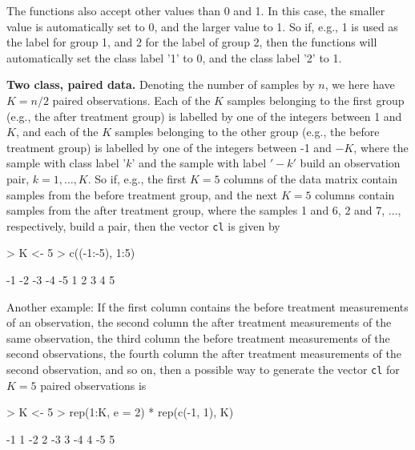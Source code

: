 \documentclass[a4paper]{article}
\begin{document}
The functions also accept other values than 0 and 1. In this case,
the smaller value is automatically set to 0, and the larger value
to 1. So if, e.g., 1 is used as the label for group 1, and 2 for
the label of group 2, then the functions will automatically set the
class label '1' to 0, and the class label '2' to 1.


\vspace*{18pt} \noindent \textbf{Two class, paired data.} Denoting
the number of samples by $n$, we here have $K=n/2$ paired
observations. Each of the $K$ samples belonging to the first group
(e.g., the after treatment group) is labelled by one of the
integers between 1 and $K$, and each of the $K$ samples belonging
to the other group (e.g., the before treatment group) is labelled
by one of the integers between -1 and $-K$, where the sample with
class label '$k$' and the sample with label $'-k'$ build an
observation pair, $k=1,\ldots,K$. So if, e.g., the first $K=5$
columns of the data matrix contain samples from the before
treatment group, and the next $K=5$ columns contain samples from
the after treatment group, where the samples 1 and 6, 2 and 7,
..., respectively, build a pair, then the vector \texttt{cl} is
given by

\begin{Schunk}
\begin{Sinput}
> K <- 5
> c((-1:-5), 1:5)
\end{Sinput}
\begin{Soutput}
 [1] -1 -2 -3 -4 -5  1  2  3  4  5
\end{Soutput}
\end{Schunk}


Another example: If the first column contains the before treatment
measurements of an observation, the second column the after
treatment measurements of the same observation, the third column
the before treatment measurements of the second observations, the
fourth column the after treatment measurements of the second
observation, and so on, then a possible way to generate the vector
\texttt{cl} for $K=5$ paired observations is

\begin{Schunk}
\begin{Sinput}
> K <- 5
> rep(1:K, e = 2) * rep(c(-1, 1), K)
\end{Sinput}
\begin{Soutput}
 [1] -1  1 -2  2 -3  3 -4  4 -5  5
\end{Soutput}
\end{Schunk}
\end{document}
